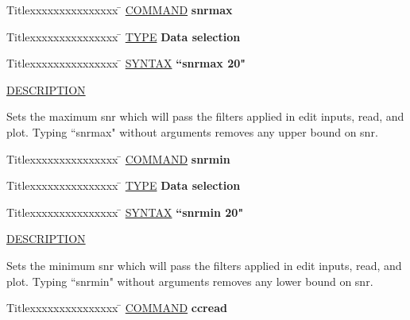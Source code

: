 \begin{tabbing}
Titlexxxxxxxxxxxxxxx \= \kill
\underline{COMMAND} \> {\bf 	snrmax} \\
\end{tabbing}

\begin{tabbing}
Titlexxxxxxxxxxxxxxx \= \kill
\underline{TYPE} \> {\bf 		Data selection} \\
\end{tabbing}

\begin{tabbing}
Titlexxxxxxxxxxxxxxx \= \kill
\underline{SYNTAX} \> {\bf 		``snrmax 20"} \\
\end{tabbing}

\underline{DESCRIPTION}
\begin{list}{}{\setlength{\leftmargin}{0.5in}
     \setlength{\rightmargin}{0in}}
\item
Sets the maximum snr which will pass the filters applied
in edit inputs, read, and plot.  Typing ``snrmax" without
arguments removes any upper bound on snr.
\end{list}
\vspace{.2in}

\begin{tabbing}
Titlexxxxxxxxxxxxxxx \= \kill
\underline{COMMAND} \> {\bf 	snrmin} \\
\end{tabbing}

\begin{tabbing}
Titlexxxxxxxxxxxxxxx \= \kill
\underline{TYPE} \> {\bf 		Data selection} \\
\end{tabbing}

\begin{tabbing}
Titlexxxxxxxxxxxxxxx \= \kill
\underline{SYNTAX} \> {\bf 		``snrmin 20"} \\
\end{tabbing}

\underline{DESCRIPTION}
\begin{list}{}{\setlength{\leftmargin}{0.5in}
     \setlength{\rightmargin}{0in}}
\item
Sets the minimum snr which will pass the filters applied
in edit inputs, read, and plot.  Typing ``snrmin" without
arguments removes any lower bound on snr.
\end{list}
\vspace{.2in}

\begin{tabbing}
Titlexxxxxxxxxxxxxxx \= \kill
\underline{COMMAND} \> {\bf 	ccread} \\
\end{tabbing}

